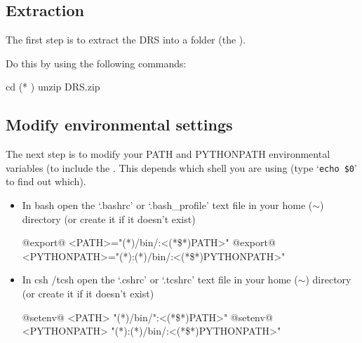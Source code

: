 \subsection{Extraction}
\label{ch:install:installunix:extraction}

The first step is to extract the DRS into a folder (the \InstallDIR).

\noindent Do this by using the following commands:
\begin{cmdbox}
cd (* \InstallDIR *)
unzip DRS.zip
\end{cmdbox}

\subsection{Modify environmental settings}
\label{ch:install:installunix:environ_settings}

The next step is to modify your PATH and PYTHONPATH environmental variables (to include the \InstallDIR. This depends which shell you are using (type `\lstinline[style=bashstyle]{echo $0}' to find out which).

\begin{itemize}
	\item In bash open the `.bashrc' or `.bash\_profile' text file in your home ($\sim$) directory (or create it if it doesn't exist)

	\begin{bashbox}[title={e.g. in $\sim$/.bashrc or $\sim$/.bash\_profile}]
	@export@ <PATH>="(*\InstallDIR*)/bin/:<(*\$*)PATH>"
	@export@ <PYTHONPATH>="(*\InstallDIR*):(*\InstallDIR*)/bin/:<(*\$*)PYTHONPATH>"
	\end{bashbox}

	\item In csh /tcsh open the `.cshrc' or `.tcshrc' text file in your home ($\sim$) directory (or create it if it doesn't exist) 

	\begin{cshbox}[title={e.g. in $\sim$/.tcshrc}]
	@setenv@ <PATH> "(*\InstallDIR*)/bin/":<(*\$*){PATH}>"
	@setenv@ <PYTHONPATH> "(*\InstallDIR*):(*\InstallDIR*)/bin/:<(*\$*){PYTHONPATH}>"
	\end{cshbox}

\end{itemize}

